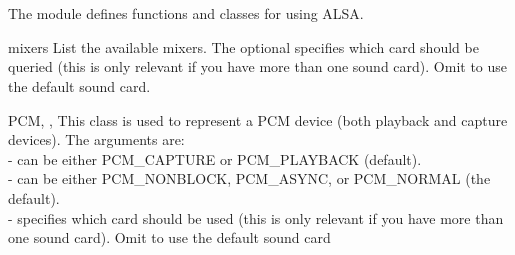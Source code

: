\section{}







The  module defines functions and classes for using
ALSA.


\begin{funcdesc}{mixers}{}
List the available mixers. The optional  specifies which
card should be queried (this is only relevant if you have more than one
sound card). Omit to use the default sound card.
\end{funcdesc}

\begin{classdesc}{PCM}{, , }
This class is used to represent a PCM device (both playback and capture devices).
The arguments are: \\
 - can be either PCM_CAPTURE or PCM_PLAYBACK (default). \\
 - can be either PCM_NONBLOCK, PCM_ASYNC, or PCM_NORMAL (the default).\\
 - specifies which card should be used (this is only relevant 
if you have more than one sound card). Omit to use the default sound card
\end{classdesc}


